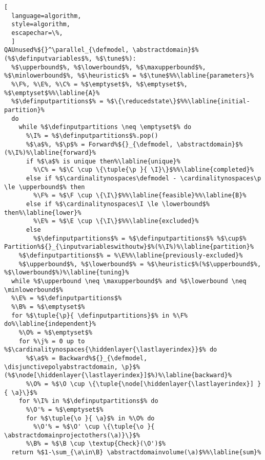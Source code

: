{\begin{marginalgorithm}
  \caption{Parallel Implementation $\parallelqlibra$}
\begin{lstlisting}[
  language=algorithm,
  style=algorithm,
  escapechar=\%,
  ]
QAUnused%${}^\parallel_{\defmodel, \abstractdomain}$%(%$\definputvariables$%, %$\tune$%):
  %$\upperbound$%, %$\lowerbound$%, %$\maxupperbound$%, %$\minlowerbound$%, %$\heuristic$% = %$\tune$%%\labline{parameters}%
  %\F%, %\E%, %\C% = %$\emptyset$%, %$\emptyset$%, %$\emptyset$%%\labline{A}%
  %$\definputpartitions$% = %$\{\reducedstate\}$%%\labline{initial-partition}%
  do
    while %$\definputpartitions \neq \emptyset$% do
      %\I% = %$\definputpartitions$%.pop()
      %$\a$%, %$\p$% = Forward%${}_{\defmodel, \abstractdomain}$%(%\I%)%\labline{forward}%
      if %$\a$% is unique then%\labline{unique}%
        %\C% = %$\C \cup \{\tuple{\p }{ \I}\}$%%\labline{completed}%
      else if %$\cardinalitynospaces\defmodel - \cardinalitynospaces\p \le \upperbound$% then
        %\F% = %$\F \cup \{\I\}$%%\labline{feasible}%%\labline{B}%
      else if %$\cardinalitynospaces\I \le \lowerbound$% then%\labline{lower}%
        %\E% = %$\E \cup \{\I\}$%%\labline{excluded}%
      else
        %$\definputpartitions$% = %$\definputpartitions$% %$\cup$% Partition%${}_{\inputvariableswithoutw}$%(%\I%)%\labline{partition}%
    %$\definputpartitions$% = %\E%%\labline{previously-excluded}%
    %$\upperbound$%, %$\lowerbound$% = %$\heuristic$%(%$\upperbound$%, %$\lowerbound$%)%\labline{tuning}%
  while %$\upperbound \neq \maxupperbound$% and %$\lowerbound \neq \minlowerbound$%
  %\E% = %$\definputpartitions$%
  %\B% = %$\emptyset$%
  for %$\tuple{\p}{ \definputpartitions}$% in %\F% do%\labline{independent}%
    %\O% = %$\emptyset$%
    for %\j% = 0 up to %$\cardinalitynospaces{\hiddenlayer{\lastlayerindex}}$% do
      %$\a$% = Backward%${}_{\defmodel, \disjunctivepolyabstractdomain, \p}$%(%$\node[\hiddenlayer{\lastlayerindex}]$%)%\labline{backward}%
      %\O% = %$\O \cup \{\tuple{\node[\hiddenlayer{\lastlayerindex}] }{ \a}\}$%
    for %\I% in %$\definputpartitions$% do
      %\O'% = %$\emptyset$%
      for %$\tuple{\o }{ \a}$% in %\O% do
        %\O'% = %$\O' \cup \{\tuple{\o }{ \abstractdomainprojectothers(\a)}\}$%
      %\B% = %$\B \cup \textup{Check}(\O')$%
  return %$1-\sum_{\a\in\B} \abstractdomainvolume(\a)$%%\labline{sum}%
\end{lstlisting}
\end{marginalgorithm}

}
